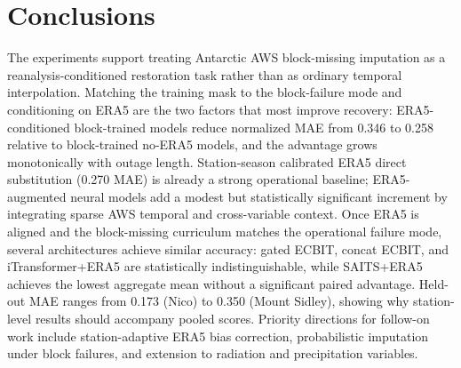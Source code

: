 \section{Conclusions}

The experiments support treating Antarctic AWS block-missing imputation as a reanalysis-conditioned restoration task rather than as ordinary temporal interpolation. Matching the training mask to the block-failure mode and conditioning on ERA5 are the two factors that most improve recovery: ERA5-conditioned block-trained models reduce normalized MAE from 0.346 to 0.258 relative to block-trained no-ERA5 models, and the advantage grows monotonically with outage length. Station-season calibrated ERA5 direct substitution (0.270 MAE) is already a strong operational baseline; ERA5-augmented neural models add a modest but statistically significant increment by integrating sparse AWS temporal and cross-variable context. Once ERA5 is aligned and the block-missing curriculum matches the operational failure mode, several architectures achieve similar accuracy: gated ECBIT, concat ECBIT, and iTransformer+ERA5 are statistically indistinguishable, while SAITS+ERA5 achieves the lowest aggregate mean without a significant paired advantage. Held-out MAE ranges from 0.173 (Nico) to 0.350 (Mount Sidley), showing why station-level results should accompany pooled scores. Priority directions for follow-on work include station-adaptive ERA5 bias correction, probabilistic imputation under block failures, and extension to radiation and precipitation variables.
